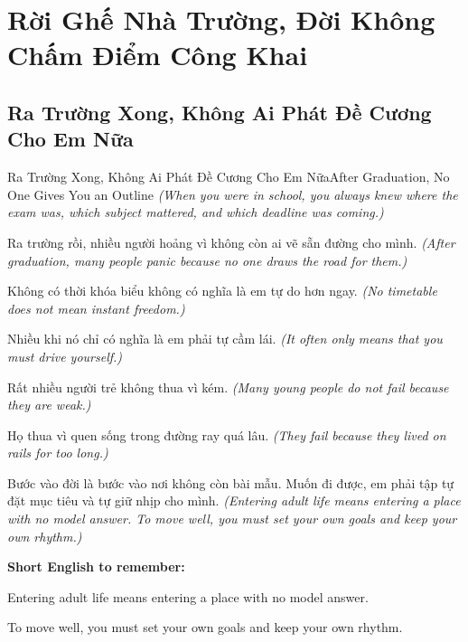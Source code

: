 \chapter{Rời Ghế Nhà Trường, Đời Không Chấm Điểm Công Khai}

\section{Ra Trường Xong, Không Ai Phát Đề Cương Cho Em Nữa}
\begin{truyen}{Ra Trường Xong, Không Ai Phát Đề Cương Cho Em Nữa}{After Graduation, No One Gives You an Outline}
\textit{(When you were in school, you always knew where the exam was, which subject mattered, and which deadline was coming.)}

Ra trường rồi, nhiều người hoảng vì không còn ai vẽ sẵn đường cho mình.
\textit{(After graduation, many people panic because no one draws the road for them.)}

Không có thời khóa biểu không có nghĩa là em tự do hơn ngay.
\textit{(No timetable does not mean instant freedom.)}

Nhiều khi nó chỉ có nghĩa là em phải tự cầm lái.
\textit{(It often only means that you must drive yourself.)}

Rất nhiều người trẻ không thua vì kém.
\textit{(Many young people do not fail because they are weak.)}

Họ thua vì quen sống trong đường ray quá lâu.
\textit{(They fail because they lived on rails for too long.)}

\end{truyen}

\begin{baihoc}
Bước vào đời là bước vào nơi không còn bài mẫu. Muốn đi được, em phải tập tự đặt mục tiêu và tự giữ nhịp cho mình.
\textit{(Entering adult life means entering a place with no model answer. To move well, you must set your own goals and keep your own rhythm.)}
\end{baihoc}

\begin{ghinhoanh}
\textbf{Short English to remember:}

Entering adult life means entering a place with no model answer.

To move well, you must set your own goals and keep your own rhythm.

\end{ghinhoanh}

